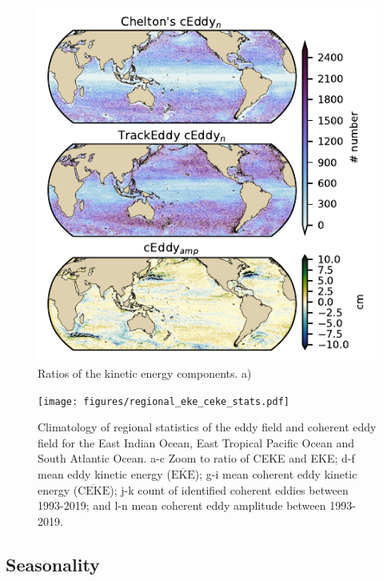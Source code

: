 \documentclass[draft]{agujournal2019}
\newcommand{\MEKE}{\overline{\textrm{EKE}}}
\newcommand{\MCEKE}{\overline{\textrm{CEKE}}}
\begin{document}
	\begin{figure}
	    \centering
	    \includegraphics[width=1\textwidth]{figures/global_stats.pdf}
	    \caption{Ratios of the kinetic energy components. a) }
	    \label{fig:my_label}
	\end{figure}


	\begin{figure}
	    \centering
	    \texttt{[image: figures/regional\_eke\_ceke\_stats.pdf]}
	    \caption{Climatology of regional statistics of the eddy field and coherent eddy field for the East Indian Ocean, East Tropical Pacific Ocean and South Atlantic Ocean. a-c Zoom to ratio of CEKE and EKE; d-f  mean eddy kinetic energy ($\MEKE$); g-i mean coherent eddy kinetic energy ($\MCEKE$); j-k count of identified coherent eddies between 1993-2019; and l-n mean coherent eddy amplitude between 1993-2019.}
	    \label{fig:my_label}
	\end{figure}

	

	\subsection{Seasonality}
	\label{subsec:R_season}
	
\end{document}
